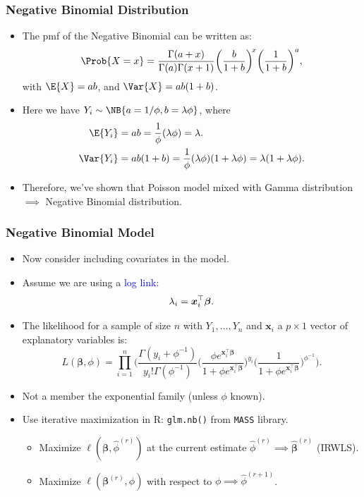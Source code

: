 \documentclass[oneside]{book}\usepackage[]{graphicx}\usepackage[svgnames]{xcolor}
\let\log\relax%
\providecommand{\Vector}[1]{\bm{#1}}%
\begin{document}
\subsubsection*{Negative Binomial Distribution}
\begin{itemize}
    \item The pmf of the Negative Binomial can be written as:
          \[ \Prob{X=x}=\frac{\Gamma(a+x)}{\Gamma(a)\Gamma(x+1)}\biggl(\frac{b}{1+b}\biggr)^{\!x}\biggl(\frac{1}{1+b}\biggr)^{a}, \]
          with $ \E{X}=ab $, and $ \Var{X}=ab(1+b) $.
    \item Here we have $ Y_i \sim \NB{a=1/\phi,b=\lambda\phi} $, where
          \begin{align*}
              \E{Y_i}   & =ab=\frac{1}{\phi}(\lambda\phi)=\lambda.                                    \\
              \Var{Y_i} & =ab(1+b)=\frac{1}{\phi}(\lambda\phi)(1+\lambda\phi)=\lambda(1+\lambda\phi).
          \end{align*}
    \item Therefore, we've shown that Poisson model mixed with Gamma distribution $ \implies $ Negative Binomial distribution.
\end{itemize}
\subsubsection*{Negative Binomial Model}
\begin{itemize}
    \item Now consider including covariates in the model.
    \item Assume we are using a \textcolor{Blue}{log link}:
          \[ \log{\lambda_i}=\Vector{x}_i^\top \Vector{\beta}. \]
    \item The likelihood for a sample of size $ n $ with $ Y_1,\ldots,Y_n $ and $ \Vector{x}_i $ a $ p\times 1 $ vector of explanatory
          variables is:
          \[ L(\Vector{\beta},\phi)=\prod_{i=1}^n
              \biggl(\frac{\Gamma(y_i+\phi^{-1})}{y_i!\Gamma(\phi^{-1})}
              \biggl(\frac{\phi e^{\Vector{x}_i^\top \Vector{\beta}}}{1+\phi e^{\Vector{x}_i^\top \Vector{\beta}}}\biggr)^{\!y_i}
              \biggl(\frac{1}{1+\phi e^{\Vector{x}_i^\top \Vector{\beta}}}\biggr)^{\!\phi^{-1}}
              \biggr). \]
    \item Not a member the exponential family (unless $ \phi $ known).
    \item Use iterative maximization in R: \texttt{glm.nb()} from \texttt{MASS} library.
          \begin{itemize}
              \item Maximize $ \ell(\Vector{\beta},\hat{\phi}^{(r)}) $ at the current estimate $ \hat{\phi}^{(r)}\implies \hat{\Vector{\beta}}^{(r)} $ (IRWLS).
              \item Maximize $ \ell(\Vector{\beta}^{(r)},\phi) $ with respect to $ \phi\implies \hat{\phi}^{(r+1)} $.
          \end{itemize}
\end{itemize}
\end{document}
